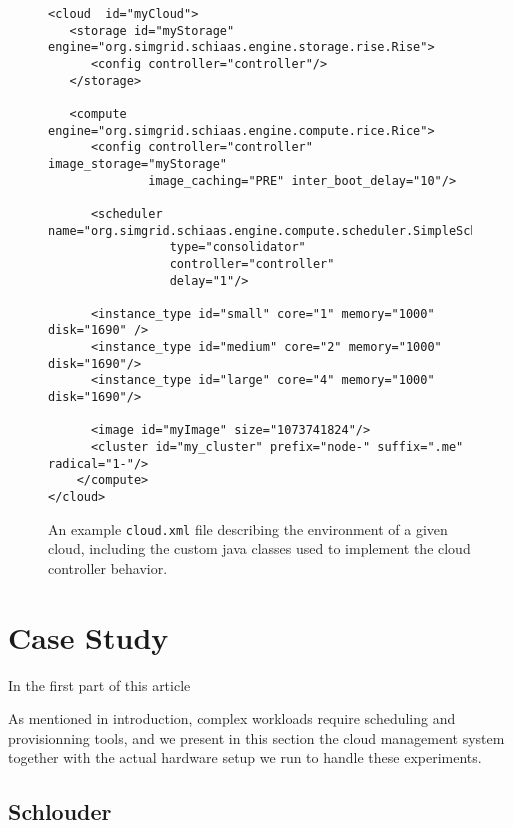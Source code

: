 \begin{figure}[hbt] 
 \lstset{language=xml,label= ,caption= ,numbers=left}
\begin{lstlisting}
<cloud  id="myCloud">
   <storage id="myStorage" engine="org.simgrid.schiaas.engine.storage.rise.Rise">
      <config controller="controller"/>
   </storage>

   <compute engine="org.simgrid.schiaas.engine.compute.rice.Rice"> 		
      <config controller="controller" image_storage="myStorage"
              image_caching="PRE" inter_boot_delay="10"/>
  
      <scheduler name="org.simgrid.schiaas.engine.compute.scheduler.SimpleScheduler"
                 type="consolidator"
                 controller="controller"
                 delay="1"/>
  
      <instance_type id="small" core="1" memory="1000" disk="1690" />				
      <instance_type id="medium" core="2" memory="1000" disk="1690"/>
      <instance_type id="large" core="4" memory="1000" disk="1690"/>
  
      <image id="myImage" size="1073741824"/>
      <cluster id="my_cluster" prefix="node-" suffix=".me" radical="1-"/>  
    </compute>
</cloud>
\end{lstlisting}
\label{fg:cloud.xml}
\caption{An example \texttt{cloud.xml} file describing the environment of a
  given cloud, including the custom java classes used to implement the
  cloud controller behavior.}
\end{figure}


\section{Case Study}
\label{sc:context}

In the first part of this article

As  mentioned   in  introduction,  complex  workloads   require  scheduling  and
provisionning tools, and we present in  this section the cloud management system
together with the actual hardware setup we run to handle these experiments.

\subsection{Schlouder}

